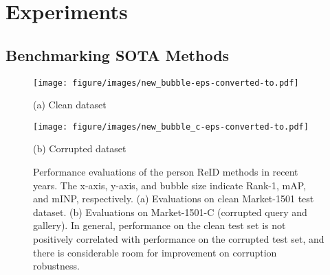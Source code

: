 

\section{Experiments}

\subsection{Benchmarking SOTA Methods}

\begin{figure}[htbp]
    \centering
    \begin{minipage}[t]{0.495\linewidth}
        \centering
        \texttt{[image: figure/images/new\_bubble-eps-converted-to.pdf]}
        \caption*{(a) Clean dataset}
    \end{minipage}
    \begin{minipage}[t]{0.495\linewidth}
        \centering
        \texttt{[image: figure/images/new\_bubble\_c-eps-converted-to.pdf]}
        \caption*{(b) Corrupted dataset}
    \end{minipage}
    \caption{Performance evaluations of the person ReID methods in recent years. The x-axis, y-axis, and bubble size indicate Rank-1, mAP, and mINP, respectively. (a) Evaluations on clean Market-1501 test dataset. (b) Evaluations on Market-1501-C (corrupted query and gallery). In general, performance on the clean test set is not positively correlated with performance on the corrupted test set, and there is considerable room for improvement on corruption robustness.}
    \vspace{-3mm}
    \label{fig:bench_method}
\end{figure}
 
